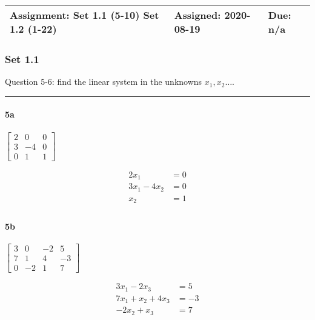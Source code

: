 \documentclass[a4paper,11pt,twoside]{report}
\begin{document}
 
\begin{table}[htpb]
	\centering
	\large
	\begin{tabular}{| p{7.6cm} | p{3.9cm} | p{3cm} |}
		\hline
		Assignment: Set 1.1 (5-10) Set 1.2 (1-22) &	Assigned: 2020-08-19   & Due: n/a \\
	\hline \end{tabular}
\end{table}
\small

\subsubsection{Set 1.1}%
\label{ssub:set_1_1}

\noindent Question 5-6: find the linear system in the unknowns $x_1, x_2\ldots$. \\ \hrule

\paragraph{5a}%

$\begin{bmatrix} 2 & 0 & 0 \\ 3 & -4 & 0 \\ 0 & 1 & 1 \end{bmatrix}$

\begin{align*}
	2x_1 &= 0 \\
	3x_1 -4x_2 &=  0 \\
	x_2 &= 1 \\
\end{align*}

\paragraph{5b}%

$\begin{bmatrix} 3 & 0 & -2 & 5 \\ 7 & 1 & 4 & -3 \\ 0 & -2 & 1 & 7 \end{bmatrix} $

\begin{align*}
	3x_1 -2x_3 &= 5 \\
	7x_1 + x_2 + 4x_3 &= -3 \\
	-2x_2 + x_3 &= 7 \\
\end{align*}
\end{document}
